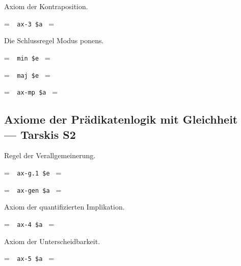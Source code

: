 \noindent Axiom der Kontraposition.

\setbox\startprefix=\hbox{\tt \ \ ax-3\ \$a\ }
\setbox\contprefix=\hbox{\tt \ \ \ \ \ \ \ \ \ \ }
\startm
\m{\vdash}\m{(}\m{(}\m{\lnot}\m{\varphi}\m{\rightarrow}\m{\lnot}\m{\psi}\m{)}\m{
\rightarrow}\m{(}\m{\psi}\m{\rightarrow}\m{\varphi}\m{)}\m{)}
\endm


\noindent Die Schlussregel Modus ponens.\label{axmp}

\setbox\startprefix=\hbox{\tt \ \ min\ \$e\ }
\setbox\contprefix=\hbox{\tt \ \ \ \ \ \ \ \ \ }
\startm
\m{\vdash}\m{\varphi}
\endm

\setbox\startprefix=\hbox{\tt \ \ maj\ \$e\ }
\setbox\contprefix=\hbox{\tt \ \ \ \ \ \ \ \ \ }
\startm
\m{\vdash}\m{(}\m{\varphi}\m{\rightarrow}\m{\psi}\m{)}
\endm

\setbox\startprefix=\hbox{\tt \ \ ax-mp\ \$a\ }
\setbox\contprefix=\hbox{\tt \ \ \ \ \ \ \ \ \ \ \ }
\startm
\m{\vdash}\m{\psi}
\endm


\subsection{Axiome der Prädikatenlogik mit Gleichheit\texorpdfstring{\\---}{ ---} Tarskis S2}

\noindent Regel der Verallgemeinerung.

\setbox\startprefix=\hbox{\tt \ \ ax-g.1\ \$e\ }
\setbox\contprefix=\hbox{\tt \ \ \ \ \ \ \ \ \ \ \ \ }
\startm
\m{\vdash}\m{\varphi}
\endm

\setbox\startprefix=\hbox{\tt \ \ ax-gen\ \$a\ }
\setbox\contprefix=\hbox{\tt \ \ \ \ \ \ \ \ \ \ \ \ }
\startm
\m{\vdash}\m{\forall}\m{\varphi}
\endm

\noindent Axiom der quantifizierten Implikation.

\setbox\startprefix=\hbox{\tt \ \ ax-4\ \$a\ }
\setbox\contprefix=\hbox{\tt \ \ \ \ \ \ \ \ \ \ }
\startm
\m{\vdash}\m{(}\m{\forall}\m{(}\m{\forall}\m{\varphi}\m{\rightarrow}\m{
\psi}\m{)}\m{\rightarrow}\m{(}\m{\forall}\m{\varphi}\m{\rightarrow}\m{
\forall}\m{\psi}\m{)}\m{)}
\endm

\noindent Axiom der Unterscheidbarkeit.

\setbox\startprefix=\hbox{\tt \ \ ax-5\ \$a\ }
\setbox\contprefix=\hbox{\tt \ \ \ \ \ \ \ \ \ \ }
\startm
\m{\vdash}\m{(}\m{\varphi}\m{\rightarrow}\m{\forall}\m{\varphi}\m{)}
\m{ }\m{ }\m{ }\m{\varphi}\m{ }\m{(}\m{ }\m{ }\m{ }\m{\varphi}
\m{ }\m{ }\m{)}
\endm

